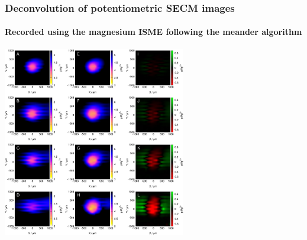 \documentclass{beamer}
\begin{document}
\begin{frame}
\begin{columns}[T]
\begin{column}{.2\textwidth}
\end{column}%
\begin{column}{.2\textwidth}
\begin{minipage}[c][0.75\textheight][c]{\linewidth}
\centering
\end{minipage}
\end{column}%
\end{columns}
\end{frame}

\begin{frame}
\begin{center}
\frametitle{Deconvolution of potentiometric SECM images}
\framesubtitle{Recorded using the magnesium ISME following the meander algorithm}
\includegraphics[width=0.6\textwidth]{mg_2d.pdf}
\end{center}
\end{frame}
\end{document}
